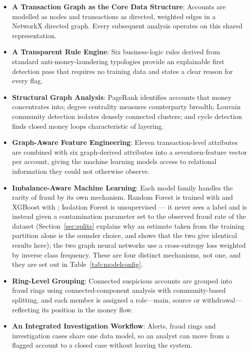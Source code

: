 \begin{itemize}
  \item \textbf{A Transaction Graph as the Core Data Structure}: Accounts are modelled as nodes and transactions as directed, weighted edges in a NetworkX directed graph. Every subsequent analysis operates on this shared representation.
  \item \textbf{A Transparent Rule Engine}: Six business-logic rules derived from standard anti-money-laundering typologies provide an explainable first detection pass that requires no training data and states a clear reason for every flag.
  \item \textbf{Structural Graph Analysis}: PageRank identifies accounts that money concentrates into; degree centrality measures counterparty breadth; Louvain community detection isolates densely connected clusters; and cycle detection finds closed money loops characteristic of layering.
  \item \textbf{Graph-Aware Feature Engineering}: Eleven transaction-level attributes are combined with six graph-derived attributes into a seventeen-feature vector per account, giving the machine learning models access to relational information they could not otherwise observe.
  \item \textbf{Imbalance-Aware Machine Learning}: Each model family handles the rarity of fraud by its own mechanism. Random Forest is trained with  and XGBoost with ; Isolation Forest is unsupervised --- it never sees a label and is instead given a contamination parameter set to the observed fraud rate of the dataset (Section~\ref{sec:splits} explains why an estimate taken from the training partition alone is the sounder choice, and shows that the two give identical results here); the two graph neural networks use a cross-entropy loss weighted by inverse class frequency. These are four distinct mechanisms, not one, and they are set out in Table~\ref{tab:modelconfig}.
  \item \textbf{Ring-Level Grouping}: Connected suspicious accounts are grouped into fraud rings using connected-component analysis with community-based splitting, and each member is assigned a role---main, source or withdrawal---reflecting its position in the money flow.
  \item \textbf{An Integrated Investigation Workflow}: Alerts, fraud rings and investigation cases share one data model, so an analyst can move from a flagged account to a closed case without leaving the system.
\end{itemize}

